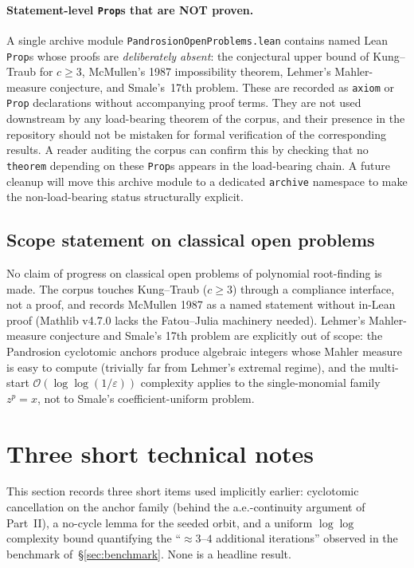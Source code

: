 \documentclass[11pt,a4paper]{article}
\theoremstyle{definition}
\begin{document}
\paragraph{Statement-level \texttt{Prop}s that are NOT proven.} A single archive module \texttt{PandrosionOpenProblems.lean} contains named Lean \texttt{Prop}s whose proofs are \emph{deliberately absent}: the conjectural upper bound of Kung--Traub for $c \geq 3$, McMullen's 1987 impossibility theorem, Lehmer's Mahler-measure conjecture, and Smale's~17th problem. These are recorded as \texttt{axiom} or \texttt{Prop} declarations without accompanying proof terms. They are not used downstream by any load-bearing theorem of the corpus, and their presence in the repository should not be mistaken for formal verification of the corresponding results. A reader auditing the corpus can confirm this by checking that no \texttt{theorem} depending on these \texttt{Prop}s appears in the load-bearing chain. A future cleanup will move this archive module to a dedicated \texttt{archive} namespace to make the non-load-bearing status structurally explicit.

\subsection{Scope statement on classical open problems}

No claim of progress on classical open problems of polynomial root-finding is made. The corpus touches Kung--Traub ($c \geq 3$) through a compliance interface, not a proof, and records McMullen 1987 as a named statement without in-Lean proof (Mathlib v4.7.0 lacks the Fatou--Julia machinery needed). Lehmer's Mahler-measure conjecture and Smale's 17th problem are explicitly out of scope: the Pandrosion cyclotomic anchors produce algebraic integers whose Mahler measure is easy to compute (trivially far from Lehmer's extremal regime), and the multi-start $\mathcal{O}(\log\log(1/\varepsilon))$ complexity applies to the single-monomial family $z^p = x$, not to Smale's coefficient-uniform problem.

\section{Three short technical notes}
\label{sec:tech-notes}

This section records three short items used implicitly earlier: cyclotomic cancellation on the anchor family (behind the a.e.-continuity argument of Part~II), a no-cycle lemma for the seeded orbit, and a uniform $\log\log$ complexity bound quantifying the ``$\approx 3$--$4$ additional iterations'' observed in the benchmark of~\S\ref{sec:benchmark}. None is a headline result.
\end{document}
